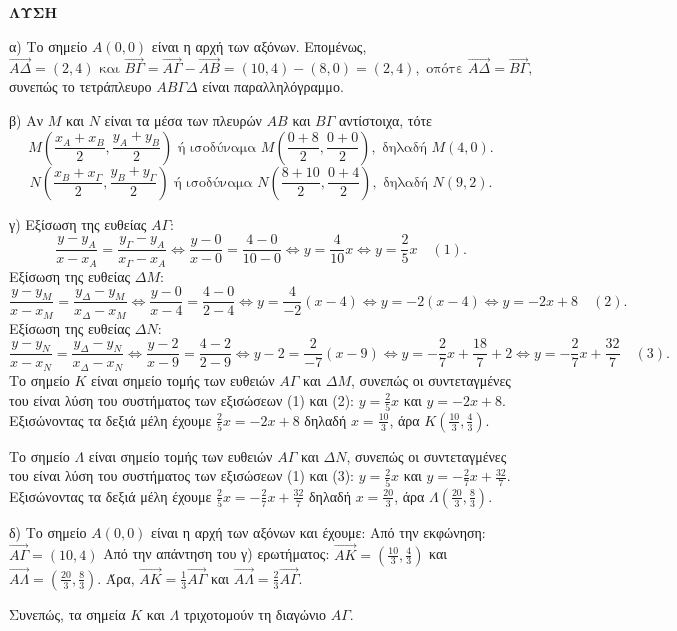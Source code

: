 \textbf{ΛΥΣΗ}

α) Το σημείο $A(0,0)$ είναι η αρχή των αξόνων. Επομένως,
\[ \vec{A\Delta} = (2,4) \text{ και } \vec{B\Gamma} = \vec{A\Gamma} - \vec{AB} = (10,4) - (8,0) = (2,4), \text{ οπότε } \vec{A\Delta} = \vec{B\Gamma}, \]
συνεπώς το τετράπλευρο $AB\Gamma\Delta$ είναι παραλληλόγραμμο.

β) Αν $M$ και $N$ είναι τα μέσα των πλευρών $AB$ και $B\Gamma$ αντίστοιχα, τότε
\[ M\left(\frac{x_A+x_B}{2}, \frac{y_A+y_B}{2}\right) \text{ ή ισοδύναμα } M\left(\frac{0+8}{2}, \frac{0+0}{2}\right), \text{ δηλαδή } M(4,0). \]
\[ N\left(\frac{x_B+x_\Gamma}{2}, \frac{y_B+y_\Gamma}{2}\right) \text{ ή ισοδύναμα } N\left(\frac{8+10}{2}, \frac{0+4}{2}\right), \text{ δηλαδή } N(9,2). \]

γ) Εξίσωση της ευθείας $A\Gamma$:
\[ \frac{y-y_A}{x-x_A} = \frac{y_\Gamma-y_A}{x_\Gamma-x_A} \Leftrightarrow \frac{y-0}{x-0} = \frac{4-0}{10-0} \Leftrightarrow y = \frac{4}{10}x \Leftrightarrow y = \frac{2}{5}x \quad (1). \]
Εξίσωση της ευθείας $\Delta M$:
\[ \frac{y-y_M}{x-x_M} = \frac{y_\Delta-y_M}{x_\Delta-x_M} \Leftrightarrow \frac{y-0}{x-4} = \frac{4-0}{2-4} \Leftrightarrow y = \frac{4}{-2}(x-4) \Leftrightarrow y = -2(x-4) \Leftrightarrow y = -2x+8 \quad (2). \]
Εξίσωση της ευθείας $\Delta N$:
\[ \frac{y-y_N}{x-x_N} = \frac{y_\Delta-y_N}{x_\Delta-x_N} \Leftrightarrow \frac{y-2}{x-9} = \frac{4-2}{2-9} \Leftrightarrow y-2 = \frac{2}{-7}(x-9) \Leftrightarrow y = -\frac{2}{7}x + \frac{18}{7} + 2 \Leftrightarrow y = -\frac{2}{7}x + \frac{32}{7} \quad (3). \]
Το σημείο $K$ είναι σημείο τομής των ευθειών $A\Gamma$ και $\Delta M$, συνεπώς οι συντεταγμένες του είναι λύση του συστήματος των εξισώσεων (1) και (2): $y = \frac{2}{5}x$ και $y = -2x+8$.
Εξισώνοντας τα δεξιά μέλη έχουμε $ \frac{2}{5}x = -2x+8 $ δηλαδή $ x = \frac{10}{3} $, άρα $ K\left(\frac{10}{3}, \frac{4}{3}\right) $.

Το σημείο $\Lambda$ είναι σημείο τομής των ευθειών $A\Gamma$ και $\Delta N$, συνεπώς οι συντεταγμένες του είναι λύση του συστήματος των εξισώσεων (1) και (3): $y = \frac{2}{5}x$ και $y = -\frac{2}{7}x + \frac{32}{7}$.
Εξισώνοντας τα δεξιά μέλη έχουμε $ \frac{2}{5}x = -\frac{2}{7}x + \frac{32}{7} $ δηλαδή $ x = \frac{20}{3} $, άρα $ \Lambda\left(\frac{20}{3}, \frac{8}{3}\right) $.

δ) Το σημείο $A(0,0)$ είναι η αρχή των αξόνων και έχουμε:
Από την εκφώνηση: $ \vec{A\Gamma} = (10,4) $
Από την απάντηση του γ) ερωτήματος: $ \vec{AK} = \left(\frac{10}{3}, \frac{4}{3}\right) $ και $ \vec{A\Lambda} = \left(\frac{20}{3}, \frac{8}{3}\right) $.
Άρα, $ \vec{AK} = \frac{1}{3}\vec{A\Gamma} $ και $ \vec{A\Lambda} = \frac{2}{3}\vec{A\Gamma} $.


Συνεπώς, τα σημεία $K$ και $\Lambda$ τριχοτομούν τη διαγώνιο $A\Gamma$.
\endlysh
